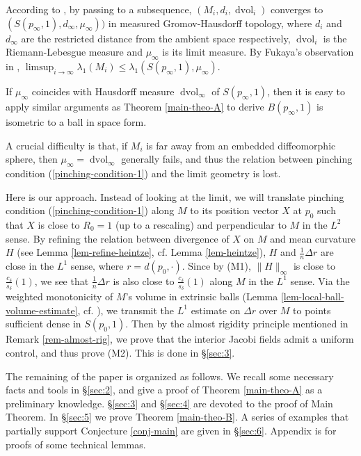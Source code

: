 \documentclass{amsart}
\numberwithin{equation}{section}
\theoremstyle{remark}
\renewcommand{\(}{\left(}
\renewcommand{\)}{\right)}
\renewcommand{\~}{\tilde}
\renewcommand{\-}{\overline}
\renewcommand{\d}{\delta}
\begin{document}
According to \cite{Fukaya1987}, by passing to a subsequence, $(M_i,d_i,\operatorname{dvol}_i)$ converges to $(S(p_\infty,1), d_\infty, \mu_\infty))$ in measured Gromov-Hausdorff topology, where $d_i$ and $d_\infty$ are the restricted distance from the ambient space respectively, $\operatorname{dvol}_i$ is the Riemann-Lebesgue measure and $\mu_\infty$ is its limit measure.
By Fukaya's observation in \cite{Fukaya1987}, $\limsup_{i\to \infty}\lambda_1(M_i)\le \lambda_1(S(p_\infty,1),\mu_\infty)$.

If $\mu_\infty$ coincides with Hausdorff measure $\operatorname{dvol}_\infty$ of $S(p_\infty,1)$, then it is easy to apply similar arguments as Theorem \ref{main-theo-A} to derive $B(p_\infty,1)$ is isometric to a ball in space form.

A crucial difficulty is that, if $M_i$ is far away from an embedded diffeomorphic sphere, then $\mu_\infty=\operatorname{dvol}_\infty$ generally fails, and thus the relation between pinching condition (\ref{pinching-condition-1}) and the limit geometry is lost.

Here is our approach. Instead of looking at the limit, we will translate pinching condition (\ref{pinching-condition-1}) along $M$ to its position vector $X$ at $p_0$ such that $X$ is close to $R_0=1$ (up to a rescaling) and perpendicular to $M$ in the $L^2$ sense. By refining the relation between divergence of $X$ on $M$ and mean curvature $H$ (see Lemma \ref{lem-refine-heintze}, cf. Lemma \ref{lem-heintze}), $H$ and $\frac{1}{n}\Delta r$ are close in the $L^1$ sense, where $r=d(p_0,\cdot)$. Since by (M1), $\|H\|_\infty$ is close to $\frac{c_\d}{s_\d}(1)$, we see that $\frac{1}{n}\Delta r$ is also close to $\frac{c_\d}{s_\d}(1)$ along $M$ in the $L^1$ sense. Via the weighted monotonicity of $M$'s volume in extrinsic balls (Lemma \ref{lem-local-ball-volume-estimate}, cf. \cite{Colding-Minicozzi-book}), we transmit the $L^1$ estimate on $\Delta r$ over $M$ to points sufficient dense in $S(p_0,1)$. Then by the almost rigidity principle mentioned in Remark \ref{rem-almost-rig}, we prove that the interior Jacobi fields admit a uniform control, and thus prove (M2). This is done in \S \ref{sec:3}.


The remaining of the paper is organized as follows. We recall some necessary facts and tools in \S \ref{sec:2}, and give a proof of Theorem \ref{main-theo-A} as a preliminary knowledge.
\S \ref{sec:3} and \S \ref{sec:4} are devoted to the proof of Main Theorem. In \S \ref{sec:5} we prove Theorem \ref{main-theo-B}. A series of examples that partially support Conjecture \ref{conj-main} are given in \S \ref{sec:6}. Appendix is for proofs of some technical lemmas.
\end{document}
